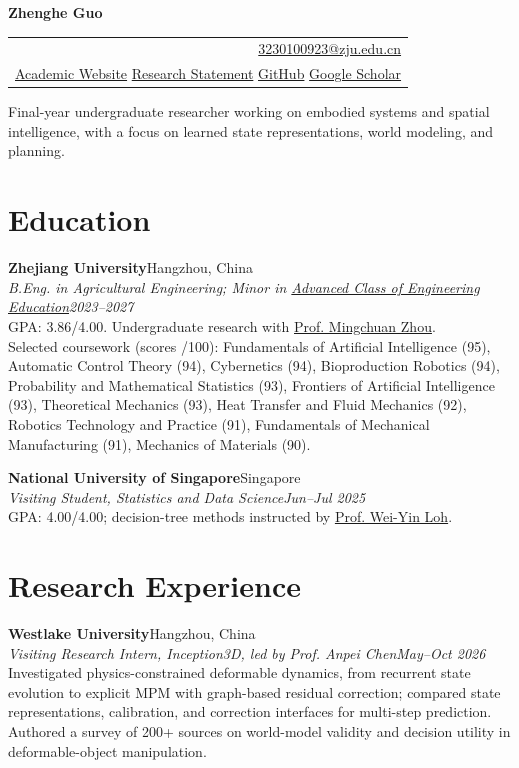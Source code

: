 \documentclass[10pt,letterpaper]{article}
\newcommand{\entry}[4]{\textbf{#1}\hfill #2\\\textit{#3}\hfill\textit{#4}\\[-1pt]}
\begin{document}
{\LARGE\bfseries Zhenghe Guo}\hfill
\begin{tabular}{r}
\href{mailto:3230100923@zju.edu.cn}{3230100923@zju.edu.cn}\\
\href{https://styokuok.github.io/main/}{Academic Website} \quad
\href{https://styokuok.github.io/main/research/}{Research Statement} \quad
\href{https://github.com/StyoKuok}{GitHub} \quad
\href{https://scholar.google.com/citations?user=aaaoBoEAAAAJ\&hl=en}{Google Scholar}
\end{tabular}

\vspace{4pt}
Final-year undergraduate researcher working on embodied systems and spatial intelligence, with a focus on learned state representations, world modeling, and planning.

\section{Education}
\entry{Zhejiang University}{Hangzhou, China}{B.Eng. in Agricultural Engineering; Minor in \href{https://baike.baidu.com/en/item/Chu\%20Kochen\%20Honors\%20College\%2C\%20Zhejiang\%20University/27012\#2-1}{Advanced Class of Engineering Education}}{2023--2027}
GPA: 3.86/4.00. Undergraduate research with \href{https://www.ce.cit.tum.de/en/air/people/alumni/httpswwwintumdei06peoplemingchuan-zhou-meng-1/}{Prof. Mingchuan Zhou}.
\\Selected coursework (scores /100): Fundamentals of Artificial Intelligence (95), Automatic Control Theory (94), Cybernetics (94), Bioproduction Robotics (94), Probability and Mathematical Statistics (93), Frontiers of Artificial Intelligence (93), Theoretical Mechanics (93), Heat Transfer and Fluid Mechanics (92), Robotics Technology and Practice (91), Fundamentals of Mechanical Manufacturing (91), Mechanics of Materials (90).

\entry{National University of Singapore}{Singapore}{Visiting Student, Statistics and Data Science}{Jun--Jul 2025}
GPA: 4.00/4.00; decision-tree methods instructed by \href{https://pages.stat.wisc.edu/~loh/}{Prof. Wei-Yin Loh}.

\section{Research Experience}
\entry{Westlake University}{Hangzhou, China}{Visiting Research Intern, Inception3D, led by Prof. Anpei Chen}{May--Oct 2026}
Investigated physics-constrained deformable dynamics, from recurrent state evolution to explicit MPM with graph-based residual correction; compared state representations, calibration, and correction interfaces for multi-step prediction. Authored a survey of 200+ sources on world-model validity and decision utility in deformable-object manipulation.
\end{document}
